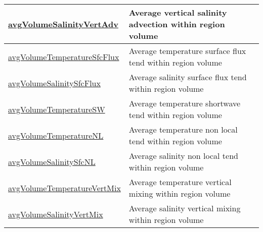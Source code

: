{\begin{center}
\begin{longtable}{| p{2.0in} | p{4.0in} |}
    \hline
    \hyperref[subsec:var_sec_layerVolumeWeightedAverageAM_avgVolumeSalinityVertAdv]{avgVolumeSalinityVertAdv} & Average vertical salinity advection within region volume \\
    \hline
    \hyperref[subsec:var_sec_layerVolumeWeightedAverageAM_avgVolumeTemperatureSfcFlux]{avgVolumeTemperatureSfcFlux} & Average temperature surface flux tend within region volume \\
    \hline
    \hyperref[subsec:var_sec_layerVolumeWeightedAverageAM_avgVolumeSalinitySfcFlux]{avgVolumeSalinitySfcFlux} & Average salinity surface flux tend within region volume \\
    \hline
    \hyperref[subsec:var_sec_layerVolumeWeightedAverageAM_avgVolumeTemperatureSW]{avgVolumeTemperatureSW} & Average temperature shortwave tend within region volume \\
    \hline
    \hyperref[subsec:var_sec_layerVolumeWeightedAverageAM_avgVolumeTemperatureNL]{avgVolumeTemperatureNL} & Average temperature non local tend within region volume \\
    \hline
    \hyperref[subsec:var_sec_layerVolumeWeightedAverageAM_avgVolumeSalinitySfcNL]{avgVolumeSalinitySfcNL} & Average salinity non local tend within region volume \\
    \hline
    \hyperref[subsec:var_sec_layerVolumeWeightedAverageAM_avgVolumeTemperatureVertMix]{avgVolumeTemperatureVertMix} & Average temperature vertical mixing within region volume \\
    \hline
    \hyperref[subsec:var_sec_layerVolumeWeightedAverageAM_avgVolumeSalinityVertMix]{avgVolumeSalinityVertMix} & Average salinity vertical mixing within region volume \\
    \hline
\end{longtable}
\end{center}
}
